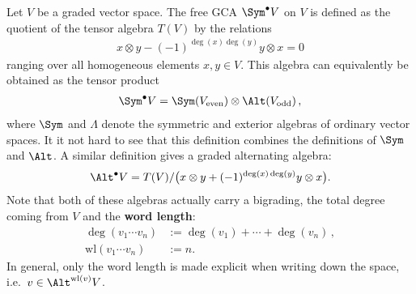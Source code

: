     \begin{example}\label{hda:symmetric_algebra}
        Let $V$ be a graded vector space. The free GCA $\Sym^\bullet V$ on $V$ is defined as the quotient of the tensor algebra $T(V)$ by the relations
        \begin{gather}
            x\otimes y-(-1)^{\deg(x)\deg(y)}y\otimes x=0
        \end{gather}
        ranging over all homogeneous elements $x,y\in V$. This algebra can equivalently be obtained as the tensor product
        \begin{gather}
            \Sym^\bullet V = \Sym(V_\mathrm{even})\otimes\Alt(V_\mathrm{odd})\,,
        \end{gather}
        where $\Sym$ and $\Lambda$ denote the symmetric and exterior algebras of ordinary vector spaces. It it not hard to see that this definition combines the definitions of $\Sym$ and $\Alt$. A similar definition gives a graded alternating algebra:
        \begin{gather}
            \Alt^\bullet V = T(V)/\big(x\otimes y+(-1)^{\deg(x)\deg(y)}y\otimes x\big).
        \end{gather}
        Note that both of these algebras actually carry a bigrading, the total degree coming from $V$ and the \textbf{word length}:
        \begin{align}
            \deg(v_1\cdots v_n) &:= \deg(v_1)+\cdots+\deg(v_n)\,,\\
            \mathrm{wl}(v_1\cdots v_n) &:= n.
        \end{align}
        In general, only the word length is made explicit when writing down the space, i.e.~$v\in\Alt^{\mathrm{wl}(v)}V$.
    \end{example}
